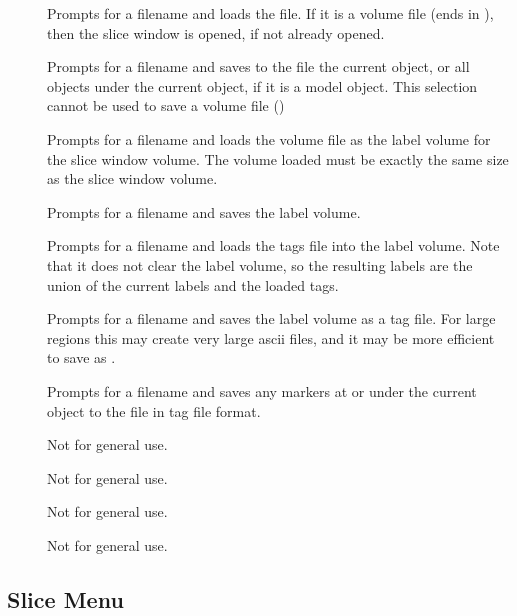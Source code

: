 \begin{description}
\item[]  Prompts for a filename and loads the file.
        If it is a volume file (ends in ), then the
        slice window is opened, if not already opened.
\item[]  Prompts for a filename and saves to the file
        the current object, or all objects under the current object, if it is
        a model object.  This selection cannot be used to save a volume
        file ()
\item[]  Prompts for a filename and
        loads the volume file as the label volume for the slice window
        volume.
        The volume loaded must be exactly the same size as the slice
        window volume.
\item[]  Prompts for a filename and
        saves the label volume.
\item[]  Prompts for a filename and
        loads the tags file into the label volume.  Note that it does not
        clear the label volume, so the resulting labels are the union
        of the current labels and the loaded tags.
\item[]  Prompts for a filename and
        saves the label volume as a tag file.  For large regions
        this may create very large ascii files, and it may be more
        efficient to save as .
\item[]  Prompts for a filename and
        saves any markers at or under the current object to the file
        in tag file format.

\item[]  Not for general use.
\item[]  Not for general use.
\item[]  Not for general use.
\item[]  Not for general use.
\end{description}

\subsection{Slice Menu}

